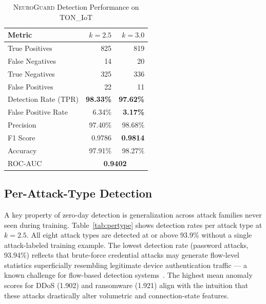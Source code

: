 \documentclass[journal,10pt,twoside]{IEEEtran}
\newcommand{\neuroguard}{\textsc{NeuroGuard}}
\begin{document}
\begin{table}[!t]
  \caption{\neuroguard{} Detection Performance on TON\_IoT}
  \label{tab:detection}
  \centering
  \begin{tabular}{lrr}
    \toprule
    Metric & $k=2.5$ & $k=3.0$ \\
    \midrule
    True Positives     & 825 & 819 \\
    False Negatives    & 14  & 20  \\
    True Negatives     & 325 & 336 \\
    False Positives    & 22  & 11  \\
    \midrule
    Detection Rate (TPR) & \textbf{98.33\%} & \textbf{97.62\%} \\
    False Positive Rate  & 6.34\%  & \textbf{3.17\%}  \\
    Precision            & 97.40\% & 98.68\% \\
    F1 Score             & 0.9786  & \textbf{0.9814}  \\
    Accuracy             & 97.91\% & 98.27\% \\
    \midrule
    ROC-AUC              & \multicolumn{2}{c}{\textbf{0.9402}} \\
    \bottomrule
  \end{tabular}
\end{table}

\subsection{Per-Attack-Type Detection}
\label{sec:per-type}

A key property of zero-day detection is generalization across attack families
never seen during training.
Table~\ref{tab:pertype} shows detection rates per attack type at $k=2.5$.
All eight attack types are detected at or above 93.9\% without a single
attack-labeled training example.
The lowest detection rate (password attacks, 93.94\%) reflects that
brute-force credential attacks may generate flow-level statistics superficially
resembling legitimate device authentication traffic --- a known challenge for
flow-based detection systems~\cite{mirsky2018kitsune}.
The highest mean anomaly scores for DDoS (1.902) and ransomware (1.921)
align with the intuition that these attacks drastically alter volumetric and
connection-state features.
\end{document}
